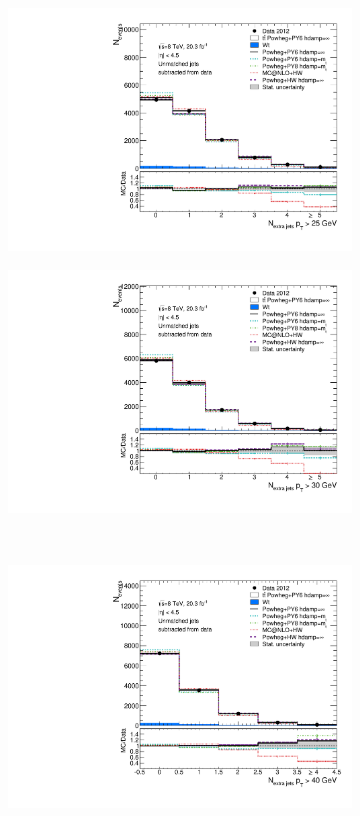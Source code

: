 \begin{figure}
\centering
\begin{subfigure}[]{0.45\textwidth}
\includegraphics[width=\textwidth]{fig/MCComp/NLO/NExtraJets25NoPileup.pdf}
\end{subfigure}
\begin{subfigure}[]{0.45\textwidth}
\includegraphics[width=\textwidth]{fig/MCComp/NLO/NExtraJets30NoPileup.pdf}
\end{subfigure}
\\
\begin{subfigure}[]{0.45\textwidth}
\includegraphics[width=\textwidth]{fig/MCComp/NLO/NExtraJets40NoPileup.pdf}

\end{subfigure}
\end{figure}
